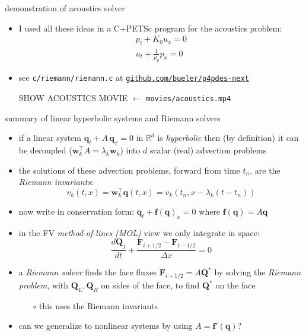 \documentclass[10pt,dvipsnames,usepdftitle=false,
hyperref={pdftitle = {Finite volume methods},
    pdfauthor = {Ed Bueler}}]{beamer}
\newcommand{\bbf}{\mathbf{f}}
\newcommand{\bq}{\mathbf{q}}
\newcommand{\bw}{\mathbf{w}}
\newcommand{\bF}{\mathbf{F}}
\newcommand{\bQ}{\mathbf{Q}}
\newcommand{\RR}{\mathbb{R}}
\begin{document}
\begin{frame}{demonstration of acoustics solver}

\begin{itemize}
\item I used all these ideas in a C$+$PETSc program for the acoustics problem:
    $$\begin{matrix} p_t + K_0 u_x = 0 \\ u_t + \frac{1}{\rho_0} p_x = 0 \end{matrix}$$
\item see \texttt{c/riemann/riemann.c} at \href{https://github.com/bueler/p4pdes-next}{\texttt{github.com/bueler/p4pdes-next}}

\vspace{3mm}
\begin{center}
\alert{SHOW ACOUSTICS MOVIE}  \qquad $\leftarrow$ \texttt{movies/acoustics.mp4}
\end{center}
\end{itemize}

\end{frame}


\begin{frame}{summary of linear hyperbolic systems and Riemann solvers}

\begin{itemize}
\item if a linear system $\bq_t + A\, \bq_x=0$ in $\RR^d$ is \alert{\emph{hyperbolic}} then (by definition) it can be decoupled ($\bw_k^\top A = \lambda_k \bw_k$) into $d$ scalar (real) advection problems
\item the solutions of these advection problems, forward from time $t_n$, are the \alert{\emph{Riemann invariants}}:
    $$v_k(t,x) = \bw_k^\top \bq(t,x) = v_k(t_n,x-\lambda_k (t-t_n))$$
\item now write in conservation form: $\bq_t + \bbf(\bq)_x=0$ where $\bbf(\bq) = A\bq$
\item in the FV \alert{\emph{method-of-lines (MOL)}} view we only integrate in space:
    $$\frac{d\bQ_j}{dt} + \frac{\bF_{i+1/2} - \bF_{i-1/2}}{\Delta x} = 0$$
\item a \alert{\emph{Riemann solver}} finds the face fluxes $\bF_{i+1/2}=A \bQ^*$ by solving the \emph{Riemann problem}, with $\bQ_L,\bQ_R$ on sides of the face, to find $\bQ^*$ on the face
    \begin{itemize}
    \item[$\circ$] this uses the Riemann invariants
    \end{itemize}

\bigskip
\footnotesize
\item can we generalize to nonlinear systems by using $A=\bbf'(\bq)$?
\end{itemize}
\end{frame}
\end{document}
